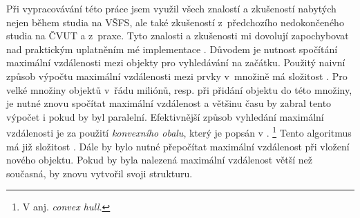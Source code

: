 Při vypracovávání této práce jsem využil všech znalostí a zkušeností nabytých nejen během studia na VŠFS, ale také zkušeností z~předchozího nedokončeného studia na ČVUT a z~praxe.
Tyto znalosti a zkušenosti mi dovolují zapochybovat nad praktickým uplatněním mé implementace .
Důvodem je nutnost spočítání maximální vzdálenosti mezi objekty pro vyhledávání na začátku.
Použitý naivní způsob výpočtu maximální vzdálenosti mezi prvky v~množině má složitost .
Pro velké množiny objektů v~řádu miliónů, resp. při přidání objektu do této množiny, je nutné znovu spočítat maximální vzdálenost a většinu času by zabral tento výpočet i pokud by byl paralelní.
Efektivnější způsob vyhledání maximální vzdálenosti je za použití \emph{konvexního obalu}, který je popsán v \cite{Cormen:2001:IA:580470}.
\footnote{V anj. \emph{convex hull}.}
Tento algoritmus má již složitost .
Dále by bylo nutné přepočítat maximální vzdálenost při vložení nového objektu.
Pokud by byla nalezená maximální vzdálenost větší než současná, \MIndex{} by znovu vytvořil svoji strukturu.